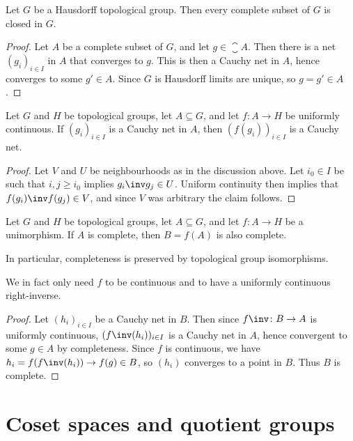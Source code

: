 \documentclass[article, a4paper, 11pt, oneside]{memoir}
\numberwithin{equation}{chapter}
\begin{document}
\begin{proposition}
    \label{thm:complete-implies-closed}
    Let $G$ be a Hausdorff topological group. Then every complete subset of $G$ is closed in $G$.
\end{proposition}

\begin{proof}
    Let $A$ be a complete subset of $G$, and let $g \in \closure{A}$. Then there is a net $(g_i)_{i \in I}$ in $A$ that converges to $g$. This is then a Cauchy net in $A$, hence converges to some $g' \in A$. Since $G$ is Hausdorff limits are unique, so $g = g' \in A$.
\end{proof}


\begin{lemma}
    Let $G$ and $H$ be topological groups, let $A \subseteq G$, and let $f \colon A \to H$ be uniformly continuous. If $(g_i)_{i \in I}$ is a Cauchy net in $A$, then $(f(g_i))_{i \in I}$ is a Cauchy net.
\end{lemma}

\begin{proof}
    Let $V$ and $U$ be neighbourhoods as in the discussion above. Let $i_0 \in I$ be such that $i,j \geq i_0$ implies $g_i\inv g_j \in U$. Uniform continuity then implies that $f(g_i)\inv f(g_j) \in V$, and since $V$ was arbitrary the claim follows.
\end{proof}


\begin{theorem}
    \label{thm:completeness-preserved-by-unimorphism}
    Let $G$ and $H$ be topological groups, let $A \subseteq G$, and let $f \colon A \to H$ be a unimorphism. If $A$ is complete, then $B = f(A)$ is also complete.

    In particular, completeness is preserved by topological group isomorphisms.
\end{theorem}
%
We in fact only need $f$ to be continuous and to have a uniformly continuous right-inverse.

\begin{proof}
    Let $(h_i)_{i \in I}$ be a Cauchy net in $B$. Then since $f\inv \colon B \to A$ is uniformly continuous, $(f\inv(h_i))_{i \in I}$ is a Cauchy net in $A$, hence convergent to some $g \in A$ by completeness. Since $f$ is continuous, we have $h_i = f(f\inv(h_i)) \to f(g) \in B$, so $(h_i)$ converges to a point in $B$. Thus $B$ is complete.
\end{proof}


\section{Coset spaces and quotient groups}
\end{document}
